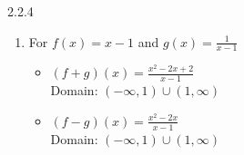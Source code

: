 \begin{Answer}{2.2.4}
\begin{enumerate}
\begin{multicols}{2}
\begin{itemize}
				\vfill

				\columnbreak

				\item $(f-g)(x) = \frac{x^2-4}{2x}$ \\
				Domain:  $(-\infty,0) \cup (0, \infty)$


			\end{itemize}

		\end{multicols}

		\begin{multicols}{2}

			\begin{itemize}

				\item $(fg)(x) = 1$ \\
				Domain: $(-\infty,0) \cup (0, \infty)$

				\vfill

				\columnbreak

				\item $\left(\frac{f}{g}\right)(x) = \frac{x^2}{4}$ \\
				Domain: $(-\infty,0) \cup (0, \infty)$


			\end{itemize}

		\end{multicols}

		\newpage

		\item For   $f(x) =x-1$ and $g(x) = \frac{1}{x-1}$

		\begin{multicols}{2}

			\begin{itemize}

				\item $(f+g)(x) = \frac{x^2-2x+2}{x-1}$ \\
				Domain: $(-\infty, 1) \cup (1, \infty)$

				\vfill

				\columnbreak

				\item $(f-g)(x) = \frac{x^2-2x}{x-1}$ \\
				Domain:  $(-\infty,1) \cup (1, \infty)$


			\end{itemize}

		\end{multicols}

		\begin{multicols}{2}


\end{multicols}
\end{enumerate}
\end{Answer}
